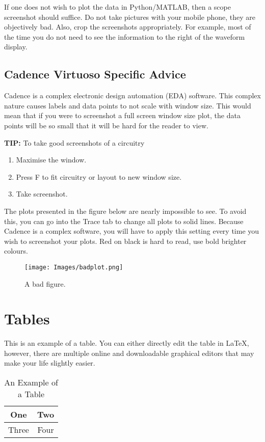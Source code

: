 \documentclass[conference,10pt]{IEEEtran}
\begin{document}
    If one does not wish to plot the data in Python/MATLAB, then a scope screenshot should suffice. Do not take pictures with your mobile phone, they are objectively bad. Also, crop the screenshots appropriately. For example, most of the time you do not need to see the information to the right of the waveform display.
    
\subsection{Cadence Virtuoso Specific Advice}

    Cadence is a complex electronic design automation (EDA) software. This complex nature causes labels and data points to not scale with window size. This would mean that if you were to screenshot a full screen window size plot, the data points will be so small that it will be hard for the reader to view.

\textbf{TIP:} To take good screenshots of a circuitry 
\begin{enumerate}
    \item Maximise the window.
    
    \item Press F to fit circuitry or layout to new window size.
    \item Take screenshot.
\end{enumerate}

    The plots presented in the figure below are nearly impossible to see. To avoid this, you can go into the Trace tab to change all plots to solid lines. Because Cadence is a complex software, you will have to apply this setting every time you wish to screenshot your plots. Red on black is hard to read, use bold brighter colours. 

\begin{figure}[h]
    \centering
    \texttt{[image: Images/badplot.png]}
    \caption{A bad figure.}
    \label{dog_meme}
\end{figure}

\newpage
\section{Tables}
    This is an example of a table. You can either directly edit the table in \LaTeX, however, there are multiple online and downloadable graphical editors that may make your life slightly easier.

\begin{table}[h!]
\renewcommand{\arraystretch}{1.3}
\caption{An Example of a Table}
\label{table_example}
\centering
\begin{tabular}{|c||c|}
    \hline
    One & Two\\
    \hline
    Three & Four\\
    \hline
\end{tabular}
\end{table}
\end{document}

